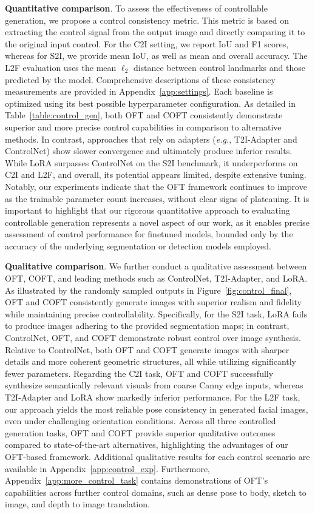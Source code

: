 \textbf{Quantitative comparison}. To assess the effectiveness of controllable generation, we propose a control consistency metric. This metric is based on extracting the control signal from the output image and directly comparing it to the original input control. For the C2I setting, we report IoU and F1 scores, whereas for S2I, we provide mean IoU, as well as mean and overall accuracy. The L2F evaluation uses the mean $\ell_2$ distance between control landmarks and those predicted by the model. Comprehensive descriptions of these consistency measurements are provided in Appendix~\ref{app:settings}. Each baseline is optimized using its best possible hyperparameter configuration. As detailed in Table~\ref{table:control_gen}, both OFT and COFT consistently demonstrate superior and more precise control capabilities in comparison to alternative methods. In contrast, approaches that rely on adapters (\emph{e.g.}, T2I-Adapter and ControlNet) show slower convergence and ultimately produce inferior results. While LoRA surpasses ControlNet on the S2I benchmark, it underperforms on C2I and L2F, and overall, its potential appears limited, despite extensive tuning. Notably, our experiments indicate that the OFT framework continues to improve as the trainable parameter count increases, without clear signs of plateauing. It is important to highlight that our rigorous quantitative approach to evaluating controllable generation represents a novel aspect of our work, as it enables precise assessment of control performance for finetuned models, bounded only by the accuracy of the underlying segmentation or detection models employed.

\textbf{Qualitative comparison}. We further conduct a qualitative assessment between OFT, COFT, and leading methods such as ControlNet, T2I-Adapter, and LoRA. As illustrated by the randomly sampled outputs in Figure~\ref{fig:control_final}, OFT and COFT consistently generate images with superior realism and fidelity while maintaining precise controllability. Specifically, for the S2I task, LoRA fails to produce images adhering to the provided segmentation maps; in contrast, ControlNet, OFT, and COFT demonstrate robust control over image synthesis. Relative to ControlNet, both OFT and COFT generate images with sharper details and more coherent geometric structures, all while utilizing significantly fewer parameters. Regarding the C2I task, OFT and COFT successfully synthesize semantically relevant visuals from coarse Canny edge inputs, whereas T2I-Adapter and LoRA show markedly inferior performance. For the L2F task, our approach yields the most reliable pose consistency in generated facial images, even under challenging orientation conditions. Across all three controlled generation tasks, OFT and COFT provide superior qualitative outcomes compared to state-of-the-art alternatives, highlighting the advantages of our OFT-based framework. Additional qualitative results for each control scenario are available in Appendix~\ref{app:control_exp}. Furthermore, Appendix~\ref{app:more_control_task} contains demonstrations of OFT's capabilities across further control domains, such as dense pose to body, sketch to image, and depth to image translation.

